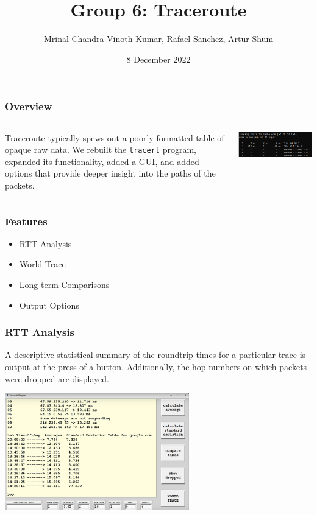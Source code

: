 \documentclass{beamer}
\title{Group 6: Traceroute}
\author{Mrinal Chandra Vinoth Kumar, Rafael Sanchez, Artur Shum}
\institute{Stevens Institute of Technology}
\date{8 December 2022}
\begin{document}
\frame{\titlepage}

\begin{frame}
\frametitle{Overview}

\begin{columns}

Traceroute typically spews out a poorly-formatted table of 
opaque raw data. We rebuilt the \texttt{tracert} program,
expanded its functionality, added a GUI, and added options 
that provide deeper insight into the paths of the packets.

  \includegraphics[width=\textwidth]{media/tracert_out.png}

\end{columns}

\end{frame}

\begin{frame}
\frametitle{Features}
\begin{itemize}
  \item RTT Analysis
  \item World Trace
  \item Long-term Comparisons
  \item Output Options
\end{itemize}
\end{frame}

\begin{frame}
\frametitle{RTT Analysis}

A descriptive statistical summary of the roundtrip times for 
a particular trace is output at the press of a button. Additionally,
the hop numbers on which packets were dropped are displayed.

\begin{center}
  \includegraphics[width=0.6\textwidth]{media/stats.png}
\end{center}

\end{frame}
\end{document}
